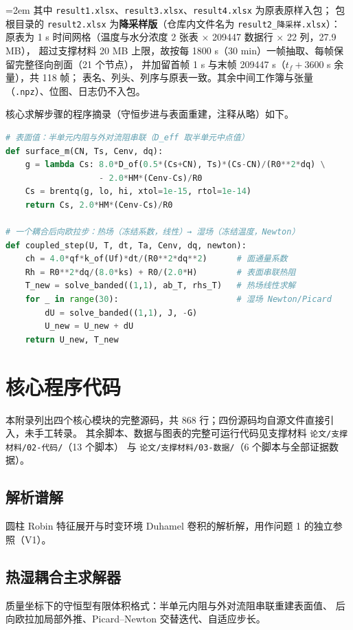 \documentclass[12pt,a4paper]{ctexart}
\numberwithin{equation}{section}
\begin{document}
{\emergencystretch=2em
其中 \texttt{result1.xlsx}、\texttt{result3.xlsx}、\texttt{result4.xlsx} 为原表原样入包；
包根目录的 \texttt{result2.xlsx} 为\textbf{降采样版}（仓库内文件名为 \texttt{result2\_降采样.xlsx}）：
原表为 1 s 时间网格（温度与水分浓度 2 张表 × 209447 数据行 × 22 列，27.9 MB），
超过支撑材料 20 MB 上限，故按每 1800 s（30 min）一帧抽取、每帧保留完整径向剖面（21 个节点），
并加留首帧 1 s 与末帧 209447 s（$t_f+3600$ s 余量），共 118 帧；
表名、列头、列序与原表一致。其余中间工作簿与张量（\texttt{.npz}）、位图、日志仍不入包。}

核心求解步骤的程序摘录（守恒步进与表面重建，注释从略）如下。

\begin{lstlisting}[language=Python,caption={守恒耦合步进核心（solver 摘录）}]
# 表面值：半单元内阻与外对流阻串联（D_eff 取半单元中点值）
def surface_m(CN, Ts, Cenv, dq):
    g = lambda Cs: 8.0*D_of(0.5*(Cs+CN), Ts)*(Cs-CN)/(R0**2*dq) \
                   - 2.0*HM*(Cenv-Cs)/R0
    Cs = brentq(g, lo, hi, xtol=1e-15, rtol=1e-14)
    return Cs, 2.0*HM*(Cenv-Cs)/R0

# 一个耦合后向欧拉步：热场（冻结系数，线性）→ 湿场（冻结温度，Newton）
def coupled_step(U, T, dt, Ta, Cenv, dq, newton):
    ch = 4.0*qf*k_of(Uf)*dt/(R0**2*dq**2)      # 面通量系数
    Rh = R0**2*dq/(8.0*ks) + R0/(2.0*H)        # 表面串联热阻
    T_new = solve_banded((1,1), ab_T, rhs_T)   # 热场线性求解
    for _ in range(30):                        # 湿场 Newton/Picard
        dU = solve_banded((1,1), J, -G)
        U_new = U_new + dU
    return U_new, T_new
\end{lstlisting}

\section{核心程序代码}
本附录列出四个核心模块的完整源码，共 868 行；四份源码均自源文件直接引入，未手工转录。
其余脚本、数据与图表的完整可运行代码见支撑材料 \texttt{论文/支撑材料/02-代码/}（13 个脚本）
与 \texttt{论文/支撑材料/03-数据/}（6 个脚本与全部证据数据）。

\subsection{解析谱解}
圆柱 Robin 特征展开与时变环境 Duhamel 卷积的解析解，用作问题 1 的独立参照（V1）。


\subsection{热湿耦合主求解器}
质量坐标下的守恒型有限体积格式：半单元内阻与外对流阻串联重建表面值、
后向欧拉加局部外推、Picard--Newton 交替迭代、自适应步长。

\end{document}

